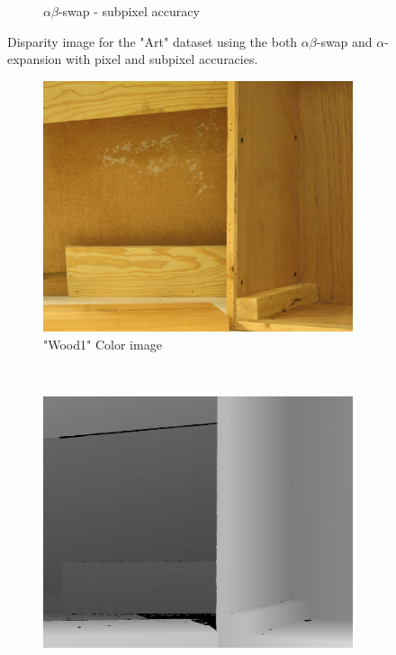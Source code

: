 \documentclass[letterpaper, 10 pt, conference]{ieeeconf}  %
\begin{document}
\begin{figure}[t]
\begin{subfigure}[b]{0.3\textwidth}
                \caption{$\alpha\beta$-swap - subpixel accuracy}
                \label{fig:farm}
        \end{subfigure}
        \caption{Disparity image for the "Art" dataset using the both $\alpha\beta$-swap and $\alpha$-expansion with pixel and subpixel accuracies.}
        \label{fig:realmaps}
\end{figure}

\begin{figure}[t]
        \centering
        \begin{subfigure}[b]{0.3\textwidth}
                \centering
                \includegraphics[width=\textwidth]{imgs/l2.png}
                \caption{"Wood1" Color image}
                \label{fig:trees}
        \end{subfigure}%
                ~ %
        \begin{subfigure}[b]{0.3\textwidth}
                \centering
                \includegraphics[width=\textwidth]{imgs/disp2.png}

\end{subfigure}
\end{figure}
\end{document}
